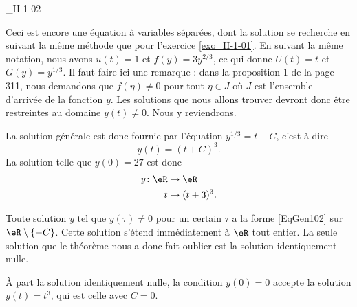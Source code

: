 \begin{corrige}{_II-1-02}

Ceci est encore une équation à variables séparées, dont la solution se recherche en suivant la même méthode que pour l'exercice \ref{exo_II-1-01}. En suivant la même notation, nous avons $u(t)=1$ et $f(y)=3y^{2/3}$, ce qui donne $U(t)=t$ et $G(y)=y^{1/3}$. Il faut faire ici une remarque : dans la proposition 1 de la page 311, nous demandons que $f(\eta)\neq 0$ pour tout $\eta\in J$ où $J$ est l'ensemble d'arrivée de la fonction $y$. Les solutions que nous allons trouver devront donc être restreintes au domaine $y(t)\neq 0$. Nous y reviendrons.

La solution générale est donc fournie par l'équation $y^{1/3}=t+C$, c'est à dire
\begin{equation}		\label{EqGen102}
	y(t)=(t+C)^3.
\end{equation}
La solution telle que $y(0)=27$ est donc
\begin{equation}
	\begin{aligned}
		y\colon \eR&\to \eR \\
		t&\mapsto (t+3)^3. 
	\end{aligned}
\end{equation}

Toute solution $y$ tel que $y(\tau)\neq 0$ pour un certain $\tau$ a la forme \eqref{EqGen102} sur $\eR\setminus\{ -C \}$. Cette solution s'étend immédiatement à $\eR$ tout entier. La seule solution que le théorème nous a donc fait oublier est la solution identiquement nulle.

 À part la solution identiquement nulle, la condition $y(0)=0$ accepte la solution $y(t)=t^3$, qui est celle avec $C=0$.

\end{corrige}


